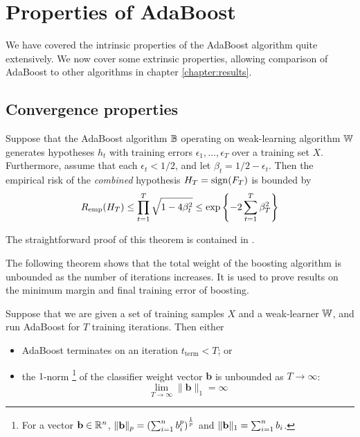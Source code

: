\section{Properties of AdaBoost}

We have covered the intrinsic properties of the AdaBoost algorithm quite
extensively.  We now cover some extrinsic properties, allowing
comparison of AdaBoost to other algorithms in chapter
\ref{chapter:results}.

\subsection{Convergence properties}

\begin{theorem}
\label{thm:AdaBoost training error convergence}
Suppose that the AdaBoost algorithm $\mathbb{B}$ operating on weak-learning
algorithm $\mathbb{W}$ generates hypotheses $h_t$ with training errors
$\epsilon_1, \ldots, \epsilon_T$ over a training set $X$.  Furthermore,
assume that each $\epsilon_t < 1/2$, and let $\beta_t = 1/2 -
\epsilon_t$.  Then the empirical risk of the \emph{combined}
hypothesis $H_T = \mathrm{sign}(F_T)$ is bounded by
%
\begin{equation}
R_{\mathrm{emp}}(H_T) \leq \prod_{t=1}^{T} \sqrt{1 - 4 \beta_t^2} \leq \exp
\left\{ - 2 \sum_{t=1}^T \beta_T^2 \right\}
\end{equation}
\end{theorem}

\proof The straightforward proof of this theorem is contained in
\cite{Freund97}.\vspace{\baselineskip}

The following theorem shows that the total weight of the boosting
algorithm is unbounded as the number of iterations increases.  It is
used to prove results on the minimum margin and final training error
of boosting.

\begin{theorem}
\label{thm:classifier weights unbounded}
Suppose that we are given a set of training samples $X$ and a
weak-learner $\mathbb{W}$, and run AdaBoost for $T$ training
iterations.  Then either
%
\begin{itemize}
\item	AdaBoost terminates on an iteration $t_{\mathrm{term}} < T$;
	or
\item	the $1$-norm%
	\footnote{For a vector $\mathbf{b} \in \mathbb{R}^n$, $\|\mathbf{b}\|_p = \left
	( \sum_{i=1}^{n} b_i^p \right)^{\frac{1}{p}}$ and $\|\mathbf{b}\|_1
	= \sum_{i=1}^{n} b_i$.}
	of the classifier weight vector $\mathbf{b}$ is
	unbounded as $T \rightarrow \infty$:
	\begin{equation}
	\lim_{T \rightarrow \infty} \| \mathbf{b} \|_1 = \infty
	\end{equation}
\end{itemize}
\end{theorem}

